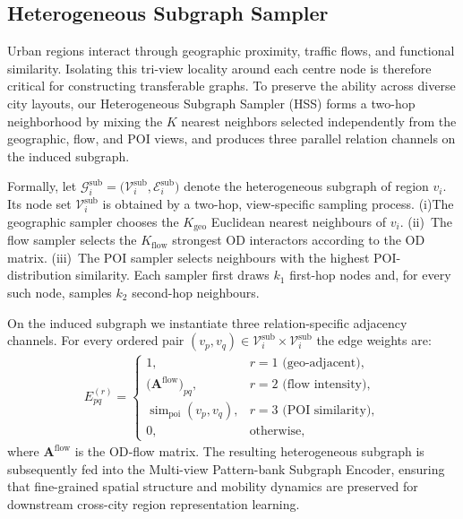 \subsection{Heterogeneous Subgraph Sampler}

Urban regions interact through geographic proximity, traffic flows, and functional similarity. Isolating this tri-view locality around each centre node is therefore critical for constructing transferable graphs. 
To preserve the ability across diverse city layouts,
our Heterogeneous Subgraph Sampler (HSS) forms a two-hop neighborhood by mixing the $K$ nearest neighbors selected independently from the geographic, flow, and POI views, and produces three parallel relation channels on the induced subgraph.

Formally, let $\mathcal G^{\text{sub}}_{i}=\bigl(\mathcal V^{\text{sub}}_{i},\mathcal E^{\text{sub}}_{i}\bigr)$ denote the heterogeneous subgraph of region $v_i$. Its node set $\mathcal V^{\text{sub}}_{i}$ is obtained by a two-hop, view-specific sampling process. (i)The geographic sampler chooses the $K_{\text{geo}}$ Euclidean nearest neighbours of $v_i$. (ii)~The flow sampler selects the $K_{\text{flow}}$ strongest OD interactors according to the OD matrix. (iii)~The POI sampler selects neighbours with the highest POI-distribution similarity. Each sampler first draws $k_1$ first-hop nodes and, for every such node, samples $k_2$ second-hop neighbours.

On the induced subgraph we instantiate three relation-specific adjacency channels. For every ordered pair $(v_p,v_q)\in\mathcal V^{\text{sub}}_{i}\times\mathcal V^{\text{sub}}_{i}$ the edge weights are:
\begin{equation}
\label{eq:edge_weight}
\begin{aligned}
    E^{(r)}_{pq}=
    \begin{cases}
    1, &r=1\text{ (geo-adjacent)},\\
    \bigl(\mathbf A^{\text{flow}}\bigr)_{pq},&r=2\text{ (flow intensity)},\\
    \operatorname{sim}_{\text{poi}}(v_p,v_q),&r=3\text{ (POI similarity)},\\
    0,&\text{otherwise},
    \end{cases}
\end{aligned}
\end{equation}
where $\mathbf A^{\text{flow}}$ is the OD‐flow matrix. The resulting heterogeneous subgraph is subsequently fed into the Multi-view Pattern-bank Subgraph Encoder, ensuring that fine-grained spatial structure and mobility dynamics are preserved for downstream cross-city region representation learning.

